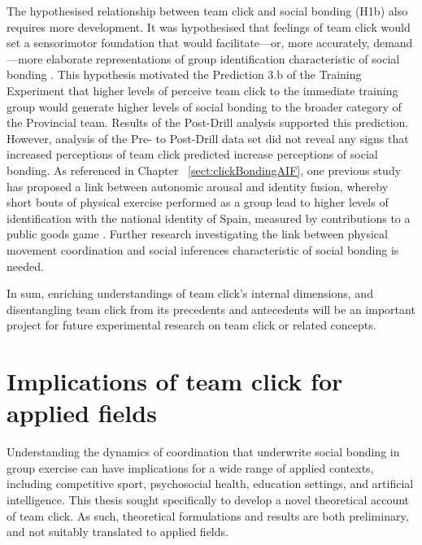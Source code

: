 The hypothesised relationship between team click and social bonding (H1b) also requires more development.  It was hypothesised that feelings of team click would set a sensorimotor foundation that would facilitate—or, more accurately, demand---more elaborate representations of group identification characteristic of social bonding \citep{Pezzulo2014}.  This hypothesis motivated the Prediction 3.b of the Training Experiment that higher levels of perceive team click to the immediate training group would generate higher levels of social bonding to the broader category of the Provincial team.  Results of the Post-Drill analysis supported this prediction. However, analysis of the Pre- to Post-Drill data set did not reveal any signs that increased perceptions of team click predicted increase perceptions of social bonding.  As referenced in Chapter ~\ref{sect:clickBondingAIF}, one previous study has proposed a link between autonomic arousal and identity fusion, whereby short bouts of physical exercise performed as a group lead to higher levels of identification with the national identity of Spain, measured by contributions to a public goods game \citep[824]{Swann2010}.  Further research investigating the link between physical movement coordination and social inferences characteristic of social bonding is needed.

In sum, enriching understandings of team click's internal dimensions, and disentangling team click from its precedents and antecedents will be an important project for future experimental research on team click or related concepts.


\section{Implications of team click for applied fields}
Understanding the dynamics of coordination that underwrite social bonding in group exercise can have implications for a wide range of applied contexts, including competitive sport, psychosocial health, education settings, and artificial intelligence.  This thesis sought specifically to develop a novel theoretical account of team click. As such, theoretical formulations and results are both preliminary, and not suitably translated to applied fields.



